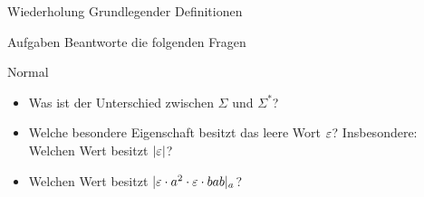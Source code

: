 %
%
%
%


{
\begin{frame}[fragile]{Wiederholung Grundlegender Definitionen}
    \begin{alertblock}{Aufgaben}
        Beantworte die folgenden Fragen
    \end{alertblock}
    \begin{block}{Normal}
        \begin{itemize}
            \item Was ist der Unterschied zwischen $\Sigma$ und $\Sigma^*$?
            \item Welche besondere Eigenschaft besitzt das leere Wort $\varepsilon$? Insbesondere: Welchen Wert besitzt $|\varepsilon|$?
            \item Welchen Wert besitzt $|\varepsilon \cdot a^2 \cdot \varepsilon \cdot bab|_a$?
        \end{itemize}
    \end{block}
\end{frame}
}

